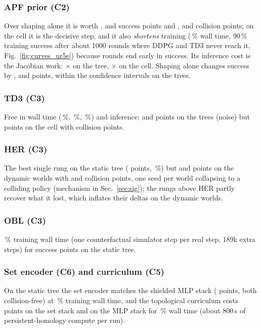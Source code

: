 \documentclass[conference]{IEEEtran}
\begin{document}
\subsubsection{APF prior (C2)}
Over shaping alone it is worth \gSstatictdherapf{}, \gSwindtdherapf{} and \gSuretdherapf{} success points and \gCstatictdherapf{}, \gCwindtdherapf{} and \gCuretdherapf{} collision points; on the cell it is the decisive step, and it also \emph{shortens} training (\gWuretdherapf{}\,\% wall time, 90\,\% training success after about 1000 rounds where DDPG and TD3 never reach it, Fig.~\ref{fig:curves_ur5e}) because rounds end early in success. Its inference cost is the Jacobian work: \gTstatictdherapf{}$\times$ on the tree, \gTuretdherapf{}$\times$ on the cell. Shaping alone changes success by \gSstatictdherapfshape{}, \gSwindtdherapfshape{} and \gSuretdherapfshape{} points, within the confidence intervals on the trees.
\subsubsection{TD3 (C3)}
Free in wall time (\gWstatictd{}\,\%, \gWwindtd{}\,\%, \gWuretd{}\,\%) and inference; \gSstatictd{} and \gSwindtd{} points on the trees (noise) but \gSuretd{} points on the cell with \gCuretd{} collision points.
\subsubsection{HER (C3)}
The best single rung on the static tree (\gSstatictdher{} points, \Sstatictdher{}\,\%) but \gSwindtdher{} and \gSuretdher{} points on the dynamic worlds with \gCwindtdher{} and \gCuretdher{} collision points, one seed per world collapsing to a colliding policy (mechanism in Sec.~\ref{sec:sig}); the rungs above HER partly recover what it lost, which inflates their deltas on the dynamic worlds.
\subsubsection{OBL (C3)}
\gWstatictdherobl{}\,\% training wall time (one counterfactual simulator step per real step, 189k extra steps) for \gSstatictdherobl{} success points on the static tree.
\subsubsection{Set encoder (C6) and curriculum (C5)}
On the static tree the set encoder matches the shielded MLP stack (\gSstaticfullset{} points, both collision-free) at \gWstaticfullset{}\,\% training wall time, and the topological curriculum costs \gSstaticfullcurriculum{} points on the set stack and \gSstaticcurriculummlp{} on the MLP stack for \gWstaticcurriculummlp{}\,\% wall time (about 800\,s of persistent-homology compute per run).
\end{document}
